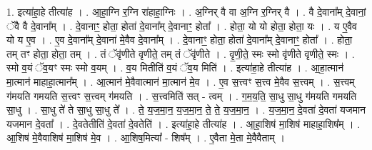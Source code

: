 \documentclass[17pt]{extarticle}
\begin{document}
1. इत्या॑हा॒हे तीत्या॑ह । . आ॒हा॒ग्नि र॒ग्नि रा॑हाहा॒ग्निः । . अ॒ग्निर् वै वा अ॒ग्नि र॒ग्निर् वै । . वै दे॒वाना᳚म् दे॒वानां॒ ॅवै वै दे॒वाना᳚म् । . दे॒वानाꣳ॒॒ होता॒ होता॑ दे॒वाना᳚म् दे॒वानाꣳ॒॒ होता᳚ । . होता॒ यो यो होता॒ होता॒ यः । . य ए॒वैव यो य ए॒व । . ए॒व दे॒वाना᳚म् दे॒वाना॑ मे॒वैव दे॒वाना᳚म् । . दे॒वानाꣳ॒॒ होता॒ होता॑ दे॒वाना᳚म् दे॒वानाꣳ॒॒ होता᳚ । . होता॒ तम् तꣳ होता॒ होता॒ तम् । . तं ॅवृ॑णीते वृणीते॒ तम् तं ॅवृ॑णीते । . वृ॒णी॒ते॒ स्मः स्मो वृ॑णीते वृणीते॒ स्मः । . स्मो व॒यं ॅव॒यꣳ स्मः स्मो व॒यम् । . व॒य मितीति॑ व॒यं ॅव॒य मिति॑ । . इत्या॑हा॒हे तीत्या॑ह । . आ॒हा॒त्मान॑ मा॒त्मान॑ माहाहा॒त्मान᳚म् । . आ॒त्मान॑ मे॒वैवात्मान॑ मा॒त्मान॑ मे॒व । . ए॒व स॒त्त्वꣳ स॒त्त्व मे॒वैव स॒त्त्वम् । . स॒त्त्वम् ग॑मयति गमयति स॒त्त्वꣳ स॒त्त्वम् ग॑मयति । . स॒त्त्वमिति॑ सत् - त्वम् । . ग॒म॒य॒ति॒ सा॒धु सा॒धु ग॑मयति गमयति सा॒धु । . सा॒धु ते॑ ते सा॒धु सा॒धु ते᳚ । . ते॒ य॒ज॒मा॒न॒ य॒ज॒मा॒न॒ ते॒ ते॒ य॒ज॒मा॒न॒ । . य॒ज॒मा॒न॒ दे॒वता॑ दे॒वता॑ यजमान यजमान दे॒वता᳚ । . दे॒वतेतीति॑ दे॒वता॑ दे॒वतेति॑ । . इत्या॑हा॒हे तीत्या॑ह । . आ॒हा॒शिष॑ मा॒शिष॑ माहाहा॒शिष᳚म् । . आ॒शिष॑ मे॒वैवाशिष॑ मा॒शिष॑ मे॒व । . आ॒शिष॒मित्या᳚ - शिष᳚म् । . ए॒वैता मे॒ता मे॒वैवैताम् । \newline
\end{document}

